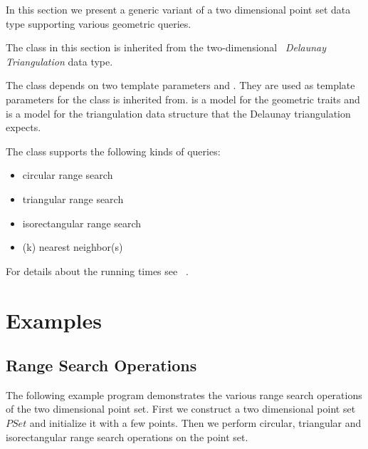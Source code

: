 In this section we present a generic variant of a two dimensional point set
data type supporting various geometric queries.

The  class in this section is inherited
from the two-dimensional \cgal\ {\em Delaunay Triangulation} data type.

The  class depends on two template parameters  and .
They are used as template parameters for the 
class  is inherited from.  is a model for the
geometric traits and  is a model for the triangulation data structure that the Delaunay triangulation
expects.

The  class supports the following kinds of queries:
\begin{itemize}
\item circular range search
\item triangular range search
\item isorectangular range search
\item (k) nearest neighbor(s)
\end{itemize}
For details about the running times see ~\cite{mn-lpcgc-00}.

\section{Examples}

\subsection{Range Search Operations}

The following example program demonstrates the various range search operations
of the two dimensional point set.
First we construct a two dimensional point set $PSet$ and initialize it with a few points.
Then we perform circular, triangular and isorectangular range search operations on the
point set.




